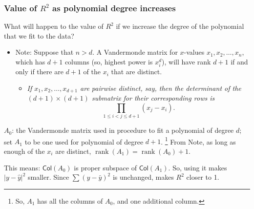 \documentclass{beamer}
\theoremstyle{example}
\begin{document}
\begin{frame}
    \frametitle{Value of $R^2$ as polynomial degree increases}
    What will happen to the value of $R^2$ if we increase the degree of the polynomial that we fit to the data?

    \begin{itemize}
        \item Note: Suppose that $n>d$. A Vandermonde matrix for $x$-values $x_1,x_2,\ldots, x_n$, which has $d+1$ columns (so, highest power is $x_i^d$), will have rank $d+1$ if and only if there are $d+1$ of the $x_i$ that are distinct.
        \begin{itemize}
            \item[] \textit{If $x_1,x_2,\ldots,x_{d+1}$ are pairwise distinct, say, then the determinant of the $(d+1)\times(d+1)$ submatrix for their corresponding rows is}
            \[{\displaystyle\prod_{1\le i<j\le d+1}(x_j - x_i)}.\]
        \end{itemize}
    \end{itemize}

    $A_0$: the Vandermonde matrix used in procedure to fit a polynomial of degree $d$; set $A_1$ to be one used for polynomial of degree $d+1$. \footnote{So, $A_{1}$ has all the columns of $A_0$, and one additional column.} From Note, as long as enough of the $x_i$ are distinct, $\operatorname{rank}(A_1) = \operatorname{rank}(A_0)+1$.

    This means: $\textsf{Col}(A_0)$ is proper subspace of $\textsf{Col}(A_1)$. So, using it makes $|y - \hat{y}|^2$ smaller. Since $\sum(y - \bar{y})^2$ is unchanged, makes $R^2$ closer to 1.
\end{frame}
\end{document}
